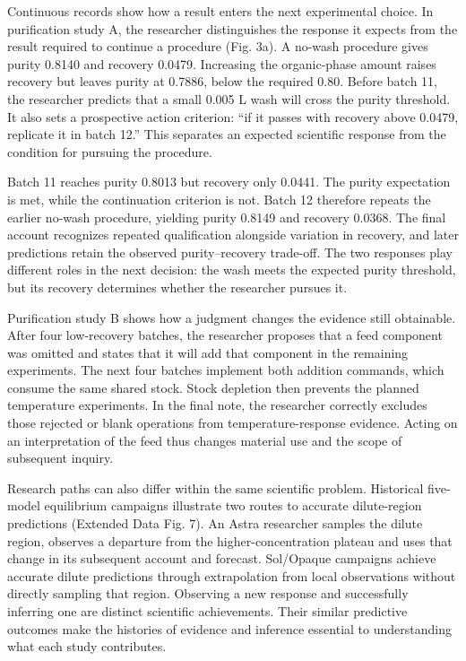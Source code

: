 \documentclass[10pt,a4paper]{article}
\begin{document}
Continuous records show how a result enters the next experimental choice. In purification study A, the researcher distinguishes the response it expects from the result required to continue a procedure (Fig. 3a). A no-wash procedure gives purity 0.8140 and recovery 0.0479. Increasing the organic-phase amount raises recovery but leaves purity at 0.7886, below the required 0.80. Before batch 11, the researcher predicts that a small 0.005 L wash will cross the purity threshold. It also sets a prospective action criterion: ``if it passes with recovery above 0.0479, replicate it in batch 12.'' This separates an expected scientific response from the condition for pursuing the procedure.

Batch 11 reaches purity 0.8013 but recovery only 0.0441. The purity expectation is met, while the continuation criterion is not. Batch 12 therefore repeats the earlier no-wash procedure, yielding purity 0.8149 and recovery 0.0368. The final account recognizes repeated qualification alongside variation in recovery, and later predictions retain the observed purity--recovery trade-off. The two responses play different roles in the next decision: the wash meets the expected purity threshold, but its recovery determines whether the researcher pursues it.

Purification study B shows how a judgment changes the evidence still obtainable. After four low-recovery batches, the researcher proposes that a feed component was omitted and states that it will add that component in the remaining experiments. The next four batches implement both addition commands, which consume the same shared stock. Stock depletion then prevents the planned temperature experiments. In the final note, the researcher correctly excludes those rejected or blank operations from temperature-response evidence. Acting on an interpretation of the feed thus changes material use and the scope of subsequent inquiry.

Research paths can also differ within the same scientific problem. Historical five-model equilibrium campaigns illustrate two routes to accurate dilute-region predictions (Extended Data Fig. 7). An Astra researcher samples the dilute region, observes a departure from the higher-concentration plateau and uses that change in its subsequent account and forecast. Sol/Opaque campaigns achieve accurate dilute predictions through extrapolation from local observations without directly sampling that region. Observing a new response and successfully inferring one are distinct scientific achievements. Their similar predictive outcomes make the histories of evidence and inference essential to understanding what each study contributes.
\end{document}
